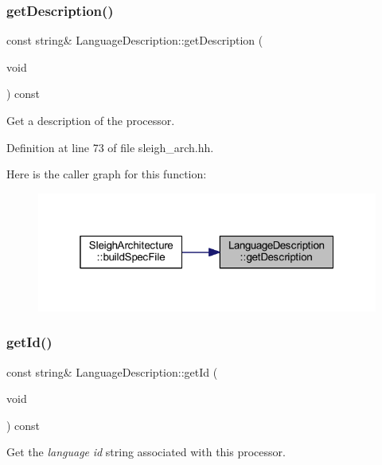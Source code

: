 \subsubsection{\texorpdfstring{getDescription()}{getDescription()}}
{\footnotesize\ttfamily const string\& Language\+Description\+::get\+Description (\begin{DoxyParamCaption}\item[{void}]{ }\end{DoxyParamCaption}) const\hspace{0.3cm}{\ttfamily [inline]}}



Get a description of the processor. 



Definition at line 73 of file sleigh\+\_\+arch.\+hh.

Here is the caller graph for this function\+:
\nopagebreak
\begin{figure}[H]
\begin{center}
\leavevmode
\includegraphics[width=319pt]{class_language_description_a45e5d45bbe225b5cafed3bfadd5de1e9_icgraph}
\end{center}
\end{figure}
\mbox{\label{class_language_description_a5e965680dedba272edd47113834f9f48}} 
\subsubsection{\texorpdfstring{getId()}{getId()}}
{\footnotesize\ttfamily const string\& Language\+Description\+::get\+Id (\begin{DoxyParamCaption}\item[{void}]{ }\end{DoxyParamCaption}) const\hspace{0.3cm}{\ttfamily [inline]}}



Get the {\itshape language} {\itshape id} string associated with this processor. 



